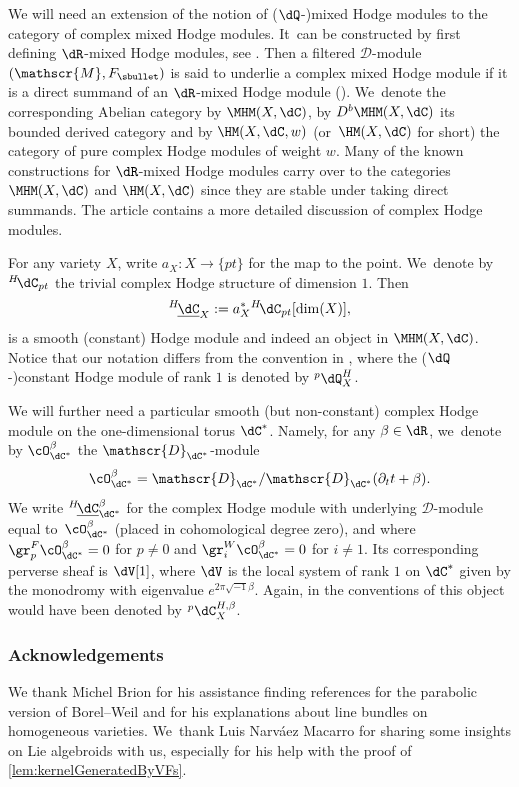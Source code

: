 \Changelback

We will need an extension of the notion of ($\dQ$-)mixed Hodge modules to the category of complex mixed Hodge modules. It~can be constructed by first defining $\dR$\nobreakdash-mixed Hodge modules,
see \cite[\S 13.5]{Mo12}. Then a filtered $\mathscr{D}$\nobreakdash-mod\-ule $(\mathscr{M},F_\sbullet)$ is said to underlie a complex mixed Hodge module if it is a direct summand of an $\dR$-mixed Hodge module (\cite[Def.\,3.2.1.]{DS13}). We~denote the corresponding Abelian category by $\MHM(X,\dC)$, by
$D^b\MHM(X,\dC)$ its bounded derived category and by
$\HM(X,\dC,w)$ (or~$\HM(X,\dC)$ for short) the category of pure complex Hodge modules of weight $w$. Many of the known constructions for $\dR$-mixed Hodge modules carry over to the categories $\MHM(X,\dC)$ and $\HM(X,\dC)$ since they are stable under taking direct summands.
The article \cite[\S 7.1 \& App.\,A]{VilonenDavis} contains a more detailed discussion of complex Hodge modules.

For any variety $X$, write $a_X \colon X\to \{pt\}$ for the map to the point. We~denote by
${^H\!}\dC_{pt}$ the trivial complex Hodge structure of dimension $1$. Then
\[
^{H\!}\underline{\dC}_{X} := a_X^* {^H\!}\dC_{pt}[\dim(X)],
\]
is a smooth (constant) Hodge module and indeed an object in $\MHM(X,\dC)$. Notice that our notation differs from the convention in \cite{Saito1, SaitoMHM}, where the ($\dQ$-)constant Hodge module of rank $1$ is denoted by ${^p}\dQ_X^H$.

We will further need a particular smooth (but non-constant) complex Hodge module on the one-dimensional torus $\dC^*$. Namely, for any $\beta\in \dR$, we~denote by $\cO^{\beta}_{\dC^*}$ the $\mathscr{D}_{\dC^*}$\nobreakdash-mod\-ule
\[
\cO^\beta_{\dC^*} = \mathscr{D}_{\dC^*} / \mathscr{D}_{\dC^*}(\partial_t t + \beta).
\]
We write ${^H\!}\underline{\dC}^\beta_{\dC^*}$ for the complex Hodge module with underlying $\mathscr{D}$\nobreakdash-mod\-ule equal to~$\cO^\beta_{\dC^*}$ (placed in cohomological degree zero), and where
$\gr^F_p \cO^\beta_{\dC^*} = 0$ for $p \neq 0$ and $\gr^W_i \cO^\beta_{\dC^*}= 0$ for $i \neq 1$. Its corresponding perverse sheaf
is $\dV[1]$, where $\dV$ is the local system of rank $1$ on $\dC^*$ given by the monodromy with eigenvalue $e^{2\pi \sqrt{-1} \beta}$. Again, in the conventions of \cite{Saito1, SaitoMHM} this object would have been denoted by
${^p}\dC_X^{H,\beta}$.

\subsubsection*{Acknowledgements}
We thank Michel Brion for his assistance finding references for the parabolic version of Borel--Weil and for his explanations about line bundles on homogeneous varieties. We~thank Luis Narváez Macarro for sharing some insights on Lie algebroids with us, especially for his help with the proof of \cref{lem:kernelGeneratedByVFs}.

